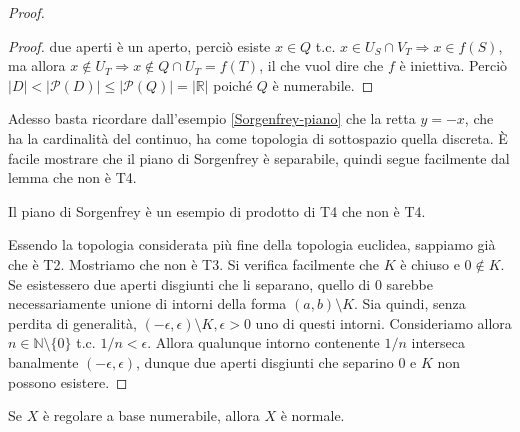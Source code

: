 \begin{proof}
\begin{proof}
    due aperti è un aperto, perciò esiste $x \in Q$ t.c. $x \in U_S \cap V_T \Rightarrow x \in f(S)$, ma allora $x \not\in U_T \Rightarrow x \not\in Q \cap U_T =f(T)$, il che vuol dire che $f$ è iniettiva. Perciò $|D| < |\mathcal{P}(D)| \le |\mathcal{P}(Q)|=|\mathbb{R}|$ poiché $Q$ è numerabile.
  \end{proof}
  Adesso basta ricordare dall'esempio \ref{Sorgenfrey-piano} che la retta $y=-x$, che ha la cardinalità del continuo, ha come topologia di sottospazio quella discreta. È facile mostrare che il piano di Sorgenfrey è separabile, quindi segue facilmente dal lemma che non è T4.
  \begin{oss}
    Il piano di Sorgenfrey è un esempio di prodotto di T4 che non è T4.
  \end{oss}
  \item Essendo la topologia considerata più fine della topologia euclidea, sappiamo già che è T2. Mostriamo che non è T3. Si verifica facilmente che $K$ è chiuso e $0 \not\in K$. Se esistessero due aperti disgiunti che li separano, quello di $0$ sarebbe necessariamente unione di intorni della forma $(a, b) \setminus K$. Sia quindi, senza perdita di generalità, $(-\epsilon, \epsilon) \setminus K, \epsilon>0$ uno di questi intorni. Consideriamo allora $n \in \mathbb{N} \setminus \{0\}$ t.c. $1/n < \epsilon$. Allora qualunque intorno contenente $1/n$ interseca banalmente $(-\epsilon, \epsilon)$, dunque due aperti disgiunti che separino $0$ e $K$ non possono esistere.
\end{proof}

\begin{thm}
  Se $X$ è regolare a base numerabile, allora $X$ è normale.
\end{thm}

